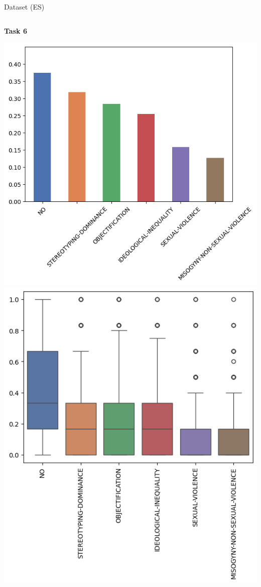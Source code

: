 \begin{frame}{Dataset (ES)}
\begin{columns}[T]
        \begin{column}{0.3\textwidth}
            \centering %
            \textbf{Task 6}

            \includegraphics[height=0.4\textheight, width=\textwidth, keepaspectratio]{images/t6_es_hard_presentacion.png}%
            \vfill
            \includegraphics[height=0.4\textheight, width=\textwidth, keepaspectratio]{images/t6_es_soft_presentacion.png}%
        \end{column}
    \end{columns}
\end{frame}

